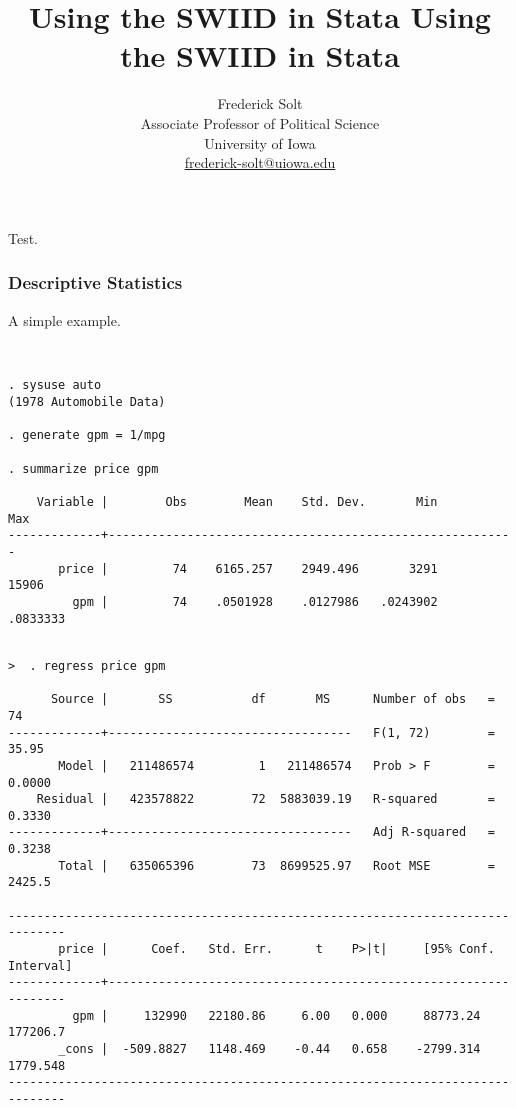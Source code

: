 \documentclass[11pt,]{article}
\title{Using the SWIID in Stata  }
\theoremstyle{definition}
\theoremstyle{definition}
\theoremstyle{remark}
\begin{document}
	
%

{\title{Using the SWIID in Stata}
	\author{
		Frederick Solt\\
		Associate Professor of Political Science\\
		University of Iowa\\
		\href{mailto:frederick-solt@uiowa.edu}{frederick-solt@uiowa.edu}}
	\date{}
	\maketitle}




\noindent \singlespacing Test. \citet{johnson_trends_1997}

\subsubsection{Descriptive Statistics}\label{descriptive-statistics}

A simple example.

\begin{verbatim}


. sysuse auto
(1978 Automobile Data)

. generate gpm = 1/mpg

. summarize price gpm

    Variable |        Obs        Mean    Std. Dev.       Min        Max
-------------+---------------------------------------------------------
       price |         74    6165.257    2949.496       3291      15906
         gpm |         74    .0501928    .0127986   .0243902   .0833333
\end{verbatim}

\begin{verbatim}

>  . regress price gpm

      Source |       SS           df       MS      Number of obs   =        74
-------------+----------------------------------   F(1, 72)        =     35.95
       Model |   211486574         1   211486574   Prob > F        =    0.0000
    Residual |   423578822        72  5883039.19   R-squared       =    0.3330
-------------+----------------------------------   Adj R-squared   =    0.3238
       Total |   635065396        73  8699525.97   Root MSE        =    2425.5

------------------------------------------------------------------------------
       price |      Coef.   Std. Err.      t    P>|t|     [95% Conf. Interval]
-------------+----------------------------------------------------------------
         gpm |     132990   22180.86     6.00   0.000     88773.24    177206.7
       _cons |  -509.8827   1148.469    -0.44   0.658    -2799.314    1779.548
------------------------------------------------------------------------------
\end{verbatim}

\newpage
\singlespacing 

\end{document}
